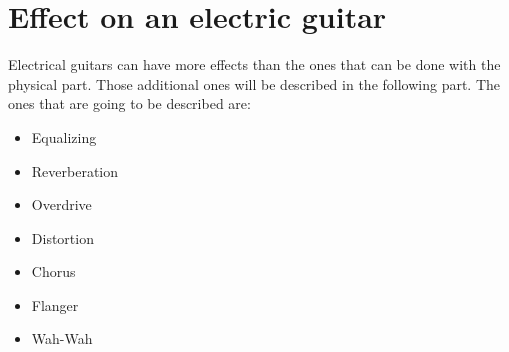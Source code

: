 

\section{Effect on an electric guitar}

Electrical guitars can have more effects than the ones that can be done with the physical part. Those additional ones will be described in the following part. The ones that are going to be described are:

\begin{itemize}
 \item Equalizing
 \item Reverberation
 \item Overdrive
 \item Distortion
 \item Chorus
 \item Flanger
 \item Wah-Wah
\end{itemize}


\newpage

\label{sec:equalizing} 
\label{sec:delay} 
\label{sec:reverberation} 
\label{sec:overdrive} 
\label{sec:chorus} 
\label{sec:wah-wah} 
